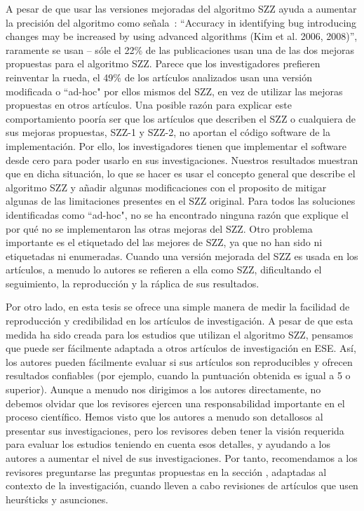 \documentclass[a4paper, 12pt]{book}
\begin{document}
A pesar de que usar las versiones mejoradas del algoritmo SZZ ayuda a aumentar la precisi\'on del algoritmo como se\~nala~\cite{rahman2012clones}: ``Accuracy in identifying bug introducing changes may be increased by using advanced algorithms (Kim et al. 2006, 2008)'', raramente se usan -- s\'ole el 22\% de las publicaciones usan una de las dos mejoras propuestas para el algoritmo SZZ. Parece que los investigadores prefieren reinventar la rueda, el 49\% de los art\'iculos analizados usan una versi\'on modificada o ``ad-hoc" por ellos mismos del SZZ, en vez de utilizar las mejoras propuestas en otros art\'iculos. Una posible raz\'on para explicar este comportamiento poor\'ia ser que los art\'iculos que describen el SZZ o cualquiera de sus mejoras propuestas, SZZ-1 y SZZ-2, no aportan el c\'odigo software de la implementaci\'on. Por ello, los investigadores tienen que implementar el software desde cero para poder usarlo en sus investigaciones. Nuestros resultados muestran que en dicha situaci\'on, lo que se hacer es usar el concepto general que describe el algoritmo SZZ y a\~nadir algunas modificaciones con el proposito de mitigar algunas de las limitaciones presentes en el SZZ original. Para todos las soluciones identificadas como ``ad-hoc", no se ha encontrado ninguna raz\'on que explique el por qu\'e no se implementaron las otras mejoras del  SZZ. Otro problema importante es el etiquetado del las mejores de SZZ, ya que no han sido ni etiquetadas ni enumeradas. Cuando una versi\'on mejorada del SZZ es usada en los art\'iculos, a menudo lo autores se refieren a ella como SZZ, dificultando el seguimiento, la reproducci\'on y la r\'aplica de sus resultados.

Por otro lado, en esta tesis se ofrece una simple manera de medir la facilidad de reproducci\'on y credibilidad en los art\'iculos de investigaci\'on. A pesar de que esta medida ha sido creada para los estudios que utilizan el algoritmo SZZ, pensamos que puede ser f\'acilmente adaptada a otros art\'iculos de investigaci\'on en ESE. As\'i, los autores pueden f\'acilmente evaluar si sus art\'iculos son reproducibles y ofrecen resultados confiables (por ejemplo, cuando la puntuaci\'on obtenida es igual a 5 o superior). Aunque a menudo nos dirigimos a los autores directamente, no debemos olvidar que los revisores ejercen una responsabilidad importante en el proceso cient\'ifico. Hemos visto que los autores a menudo son detallosos al presentar sus investigaciones, pero los revisores deben tener la visi\'on requerida para evaluar los estudios teniendo en cuenta esos detalles, y ayudando a los autores a aumentar el nivel de sus investigaciones. Por tanto, recomendamos a los revisores preguntarse las preguntas propuestas en la secci\'on , adaptadas al contexto de la investigaci\'on, cuando lleven a cabo revisiones de art\'iculos que usen heur\'sticks y asunciones. 
\end{document}
